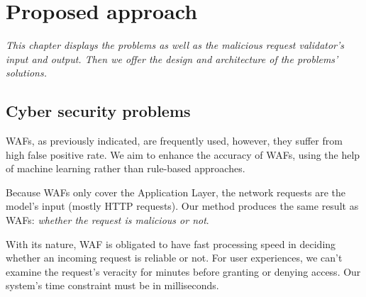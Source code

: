 \chapter{Proposed approach}
\label{chap:proposed_approaches}
	\textit{\hspace{0.5cm}This chapter displays the problems as well as the malicious request validator's input and output. Then we offer the design and architecture of the problems' solutions.}
\minitoc
 
\section{Cyber security problems}
\label{Cyber problems}
\hspace{0.5cm}WAFs, as previously indicated, are frequently used, however, they suffer from high false positive rate. We aim to enhance the accuracy of WAFs, using the help of machine learning rather than rule-based approaches.  

Because WAFs only cover the Application Layer, the network requests are the model's input (mostly HTTP requests). Our method produces the same result as WAFs: \emph{whether the request is malicious or not}.

With its nature, WAF is obligated to have fast processing speed in deciding whether an incoming request is reliable or not. For user experiences, we can't examine the request's veracity for minutes before granting or denying access. Our system's time constraint must be in milliseconds.

